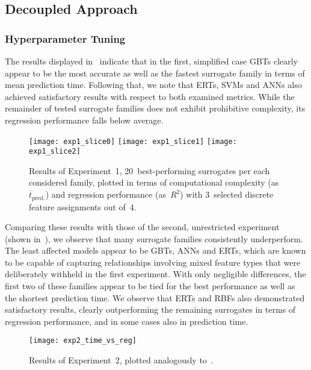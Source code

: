 \subsection{Decoupled Approach}
\label{sec:modelres}

\subsubsection{Hyperparameter Tuning}
\label{sec:res-exp12}

The results displayed in~ indicate that in the first,
simplified case GBTs clearly appear to be the most accurate as
well as the fastest surrogate family in terms of mean prediction time. Following
that, we note that ERTs, SVMs and ANNs also achieved satisfactory results with respect to both examined metrics.
While the remainder of tested surrogate families does not exhibit prohibitive
complexity, its regression performance falls below average.

\begin{figure}
	\centering
	\texttt{[image: exp1\_slice0]}
	\texttt{[image: exp1\_slice1]}
	\texttt{[image: exp1\_slice2]}
	\caption{\label{fig:exp1-time-vs-reg}Results of Experiment~1, 20~best-performing surrogates per each considered family, plotted in
		terms of computational complexity (as~$\overline{t}_{\text{pred.}}$) and regression
		performance (as~$R^2$) with 3~selected discrete feature assignments out
		of~4.}
\end{figure}

Comparing these results with those of the second, unrestricted experiment (shown
in~), we observe that many surrogate families
consistently underperform. The least
affected models appear to be GBTs, ANNs and ERTs, which are known to be capable of capturing relationships
involving mixed feature types that were deliberately withheld in the first
experiment. With only negligible differences, the first two of these families
appear to be tied for the best performance as well as the shortest prediction
time. We observe that ERTs and RBFs also
demonstrated satisfactory results, clearly outperforming the remaining surrogates in
terms of regression performance, and in some cases also in prediction time.

\begin{figure}
	\centering
	\texttt{[image: exp2\_time\_vs\_reg]}
	\caption{\label{fig:exp2-time-vs-reg}Results of Experiment~2, plotted analogously
	to~.}
\end{figure}

